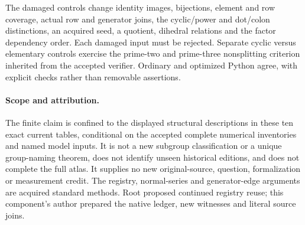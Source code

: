\documentclass[11pt]{article}
\begin{document}
The damaged controls change identity images, bijections, element and row
coverage, actual row and generator joins, the
cyclic/power and dot/colon distinctions, an acquired seed, a quotient,
dihedral relations and the factor dependency order. Each damaged input
must be rejected. Separate cyclic versus elementary controls exercise the
prime-two and prime-three nonsplitting criterion inherited from the
accepted verifier. Ordinary and optimized Python agree, with explicit
checks rather than removable assertions.

\paragraph{Scope and attribution.}
The finite claim is confined to the displayed structural descriptions in
these ten exact current tables, conditional on the accepted complete
numerical inventories and named model inputs. It is not a new subgroup
classification or a unique group-naming theorem, does not identify unseen
historical editions, and does not complete the full atlas. It supplies no
new original-source, question, formalization or measurement credit. The
registry, normal-series and generator-edge arguments are acquired standard
methods. Root proposed continued registry reuse; this component's author
prepared the native ledger, new witnesses and literal source joins.
\end{document}
